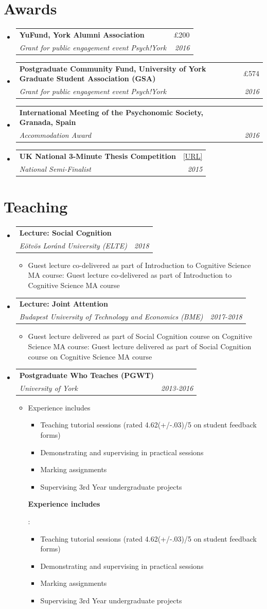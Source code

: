 \documentclass[letterpaper,11pt]{article}
\makeatletter
\def \ifempty#1{\def\temp{#1} \ifx\temp\empty }
\newcommand{\resumeItem}[2]{
  \item\small{
  	\ifempty{#1}#2\else\textbf{#1}{: #2 \vspace{-2pt}}\fi
  }
}
\newcommand{\resumeSubheading}[4]{
  \vspace{-1pt}\item
    \begin{tabular*}{0.97\textwidth}{l@{\extracolsep{\fill}}r}
      \textbf{#1} & #2 \\
      \textit{\small#3} & \textit{\small #4} \\
    \end{tabular*}\vspace{-5pt}
}
\newcommand{\resumeSubHeadingListStart}{\begin{itemize}[label = {},leftmargin=*]}
\newcommand{\resumeSubHeadingListEnd}{\end{itemize}}
\newcommand{\resumeItemListStart}{\begin{itemize}[label = {}]}
\newcommand{\resumeItemListEnd}{\end{itemize}\vspace{-5pt}}
\makeatother
\begin{document}
\section{Awards}
  \resumeSubHeadingListStart
    \resumeSubheading
      {YuFund, York Alumni Association}{£200}
      {Grant for public engagement event Psych!York}{2016}
    \resumeSubheading
      {Postgraduate Community Fund, University of York Graduate Student Association (GSA)}{£574}
      {Grant for public engagement event Psych!York}{2016}
     \resumeSubheading
      {International Meeting of the Psychonomic Society, Granada, Spain}{}
      {Accommodation Award}{2016}
     \resumeSubheading
      {UK National 3-Minute Thesis Competition}{\href{https://www.vitae.ac.uk/events/three-minute-thesis-competition/3mt-2015/copy_of_uk-3mt-semi-finalists-2015}{[URL]}}
      {National Semi-Finalist}{2015}
  \resumeSubHeadingListEnd
  
\section{Teaching}
  \resumeSubHeadingListStart
    \resumeSubheading
      {Lecture: Social Cognition}{}
      {E{\"o}tv{\"o}s Lor{\'a}nd University (ELTE)}{2018}
      \resumeItemListStart
      	\resumeItem{}{Guest lecture co-delivered as part of Introduction to Cognitive Science MA course}
      \resumeItemListEnd
    \resumeSubheading
      {Lecture: Joint Attention}{}
      {Budapest University of Technology and Economics (BME)}{2017-2018}
      \resumeItemListStart
      	\resumeItem{}{Guest lecture delivered as part of Social Cognition course on Cognitive Science MA course}
      \resumeItemListEnd
    \resumeSubheading
      {Postgraduate Who Teaches (PGWT)}{}
      {University of York}{2013-2016}
      \resumeItemListStart
      	\resumeItem{Experience includes}
      	{\begin{itemize}
      		\item
      			Teaching tutorial sessions (rated 4.62(+/-.03)/5 on student feedback forms)
			\item
				Demonstrating and supervising in practical sessions
			\item
				Marking assignments
			\item 
				Supervising 3rd Year undergraduate projects
      	\end{itemize}}
      \resumeItemListEnd
  \resumeSubHeadingListEnd
 
\end{document}
